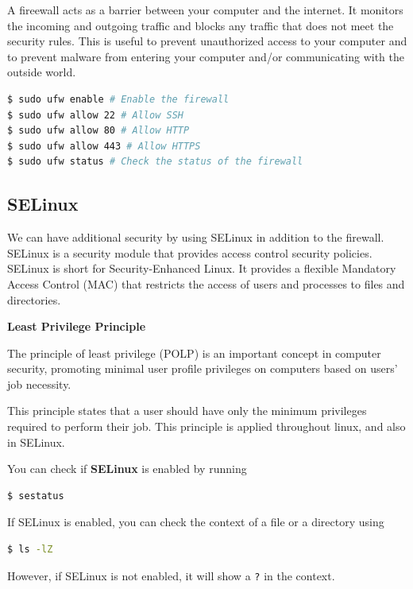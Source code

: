 A fireewall acts as a barrier between your computer
and the internet. It monitors the incoming and outgoing
traffic and blocks any traffic that does not meet the
security rules. This is useful to prevent unauthorized
access to your computer and to prevent malware from
entering your computer and/or communicating with the
outside world.

\begin{lstlisting}[language=bash]
$ sudo ufw enable # Enable the firewall
$ sudo ufw allow 22 # Allow SSH
$ sudo ufw allow 80 # Allow HTTP
$ sudo ufw allow 443 # Allow HTTPS
$ sudo ufw status # Check the status of the firewall
\end{lstlisting}

\subsection{SELinux}

We can have additional security by using SELinux
in addition to the firewall. SELinux is a security
module that provides access control security policies.
SELinux is short for Security-Enhanced Linux.
It provides a flexible Mandatory Access Control (MAC)
that restricts the access of users and processes to
files and directories.

\textbf{Least Privilege Principle}

\begin{definition}
The principle of least privilege (POLP) is an important
concept in computer security, promoting minimal user
profile privileges on computers based on users' job
necessity.
\end{definition}

This principle states that a user should have only
the minimum privileges required to perform their job.
This principle is applied throughout linux, and also
in SELinux.

You can check if \textbf{SELinux} is enabled by running

\begin{lstlisting}[language=bash]
$ sestatus
\end{lstlisting}

If SELinux is enabled, you can check the context of
a file or a directory using

\begin{lstlisting}[language=bash]
$ ls -lZ
\end{lstlisting}

However, if SELinux is not enabled, it will show
a \lstinline|?| in the context.

